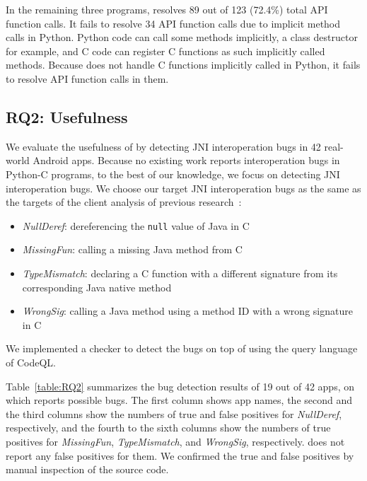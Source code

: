In the remaining three programs, \ours resolves 89 out of 123 (72.4\%) total
API function calls. 
It fails to resolve 34 API function calls due to implicit method calls in Python. 
Python code can call some methods implicitly, a class destructor for example, and C
code can register C functions as such implicitly called methods. 
Because \ours does not handle C functions implicitly called in Python, it
fails to resolve API function calls in them.




\subsection{RQ2: Usefulness}
We evaluate the usefulness of \ours by detecting JNI interoperation bugs in
42 real-world Android apps.
Because no existing work reports interoperation bugs in Python-C programs,
to the best of our knowledge, we focus on detecting JNI interoperation bugs.
We choose our target JNI interoperation bugs as the
same as the targets of the client analysis of previous research~\cite{LeeASE20, ILEA}:
\begin{itemize}
  \item {\it NullDeref}: dereferencing the {\tt null} value of Java in C
  \item {\it MissingFun}: calling a missing Java method from C
  \item {\it TypeMismatch}: declaring a C function with a different signature
    from its corresponding Java native method
  \item {\it WrongSig}: calling a Java method using a method ID with a
    wrong signature in C
\end{itemize}
We implemented a checker to detect the bugs on top of \ours using the
query language of CodeQL. 

Table~\ref{table:RQ2} summarizes the bug detection results of 19 out of 42
apps, on which \ours reports possible bugs.  The first
column shows app names, the second and the third columns show the
numbers of true and false positives for {\it NullDeref}, respectively, and
the fourth to the sixth columns show the numbers of true positives for {\it
MissingFun}, {\it TypeMismatch}, and {\it WrongSig}, respectively.
\ours does not report any false positives for them.
We confirmed the true and false positives by manual inspection of the source code. 

